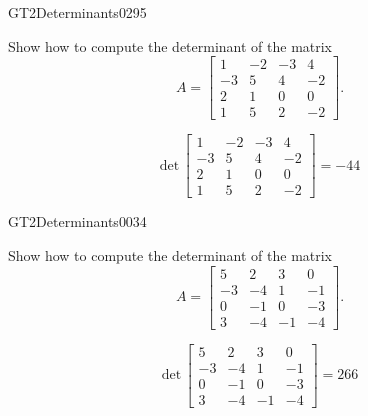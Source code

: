 \begin{exercise}{GT2}{Determinants}{0295} 
\begin{exerciseStatement} 

Show how to compute the determinant of the matrix \[A=\left[\begin{array}{cccc}
1 & -2 & -3 & 4 \\
-3 & 5 & 4 & -2 \\
2 & 1 & 0 & 0 \\
1 & 5 & 2 & -2
\end{array}\right].\]

 \end{exerciseStatement}
 \begin{exerciseAnswer} \[\mathrm{det}\,\left[\begin{array}{cccc}
1 & -2 & -3 & 4 \\
-3 & 5 & 4 & -2 \\
2 & 1 & 0 & 0 \\
1 & 5 & 2 & -2
\end{array}\right]=-44\] \end{exerciseAnswer}
 \end{exercise}



\begin{exercise}{GT2}{Determinants}{0034} 
\begin{exerciseStatement} 

Show how to compute the determinant of the matrix \[A=\left[\begin{array}{cccc}
5 & 2 & 3 & 0 \\
-3 & -4 & 1 & -1 \\
0 & -1 & 0 & -3 \\
3 & -4 & -1 & -4
\end{array}\right].\]

 \end{exerciseStatement}
 \begin{exerciseAnswer} \[\mathrm{det}\,\left[\begin{array}{cccc}
5 & 2 & 3 & 0 \\
-3 & -4 & 1 & -1 \\
0 & -1 & 0 & -3 \\
3 & -4 & -1 & -4
\end{array}\right]=266\] \end{exerciseAnswer}
 \end{exercise}


\newpage




